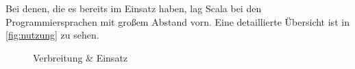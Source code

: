 \noindent
Bei denen, die es bereits im Einsatz haben, lag Scala bei den Programmiersprachen mit großem Abstand vorn. Eine detaillierte Übersicht ist in \autoref{fig:nutzung} zu sehen.
\begin{figure}[h]
  \centering
  \caption{Verbreitung \& Einsatz}\label{fig:nutzung}
\end{figure}
